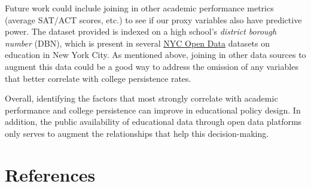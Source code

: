 \documentclass[
  man,floatsintext]{apa6}
\begin{document}
Future work could include joining in other academic performance metrics (average SAT/ACT scores, etc.) to see if our proxy variables also have predictive power. The dataset provided is indexed on a high school's \emph{district borough number} (DBN), which is present in several \href{https://opendata.cityofnewyork.us}{NYC Open Data} datasets on education in New York City. As mentioned above, joining in other data sources to augment this data could be a good way to address the omission of any variables that better correlate with college persistence rates.

Overall, identifying the factors that most strongly correlate with academic performance and college persistence can improve in educational policy design. In addition, the public availability of educational data through open data platforms only serves to augment the relationships that help this decision-making.

\newpage

\hypertarget{references}{%
\section{References}\label{references}}
\end{document}
